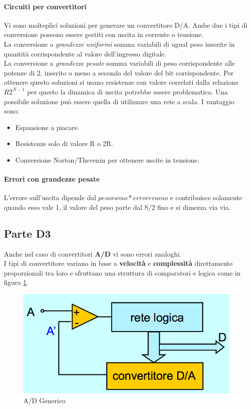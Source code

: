 \documentclass[12pt]{article}
\begin{document}
\paragraph{Circuiti per convertitori} Vi sono molteplici soluzioni per generare un convertitore D/A. Ambe due i tipi di conversione possono essere gestiti con uscita in corrente o tensione.\\
La conversione a \textit{grandezze uniformi} somma variabili di ugual peso inserite in quantità corrispondente al valore dell'ingresso digitale.\\
La conversione a \textit{grandezze pesate} somma variabili di peso corrispondente alle potenze di 2, inserito o meno a seconda del valore del bit corrispondente. Per ottenere questo soluzioni si usano resistenze con valore correlati dalla relazione $R2^{N-1}$ per questo la dinamica di uscita potrebbe essere problematica. Una possibile soluzione può essere quella di utilizzare una rete a scala. I vantaggio sono:

\begin{itemize}
  \item Espansione a piacare.
  \item Resistenze solo di valore R o 2R.
  \item Conversione Norton/Thevenin per ottenere uscite in tensione.
\end{itemize}

\paragraph{Errori con grandezze pesate} L'errore sull'uscita dipende dal $pesoramo*erroreramo$ e contribuisce solamente quando esso vale 1, il valore del peso parte dal S/2 fino e si dimezza via via.

\subsection{Parte D3}\label{d3}
Anche nel caso di convertitori \textbf{A/D} vi sono errori analoghi.\\
I tipi di convertitore variano in base a \textbf{velocità} e \textbf{complessità} direttamente proporzionali tra loro e sfruttano una struttura di comparatori e logica come in figura \ref{fig:ad_gen}.

\begin{figure}[!hpt]
  \includegraphics[width=\textwidth]{images/ad_gen.png}
  \caption{A/D Generico}
  \label{fig:ad_gen}
\end{figure}
\end{document}

